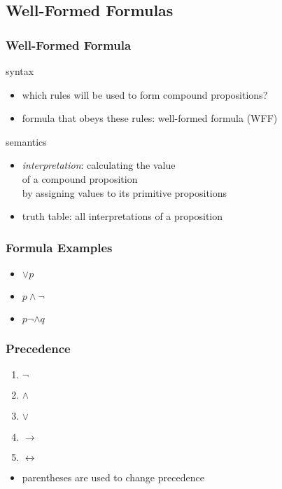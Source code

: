 \documentclass[dvipsnames]{beamer}
\begin{document}
\subsection{Well-Formed Formulas}

\begin{frame}
  \frametitle{Well-Formed Formula}

  \begin{block}{syntax}
    \begin{itemize}
      \item which rules will be used to form compound propositions?
      \item formula that obeys these rules: \alert{well-formed formula} (WFF)
    \end{itemize}
  \end{block}

  \pause
  \begin{block}{semantics}
    \begin{itemize}
      \item \emph{interpretation}: calculating the value\\
        of a compound proposition\\
        by assigning values to its primitive propositions
      \item truth table: all interpretations of a proposition
    \end{itemize}
  \end{block}
\end{frame}

\begin{frame}
  \frametitle{Formula Examples}

  \begin{example}
    \begin{itemize}
      \item $\vee p$
      \item $p \wedge \neg$
      \item $p \neg \wedge q$
    \end{itemize}
  \end{example}
\end{frame}

\begin{frame}
  \frametitle{Precedence}

  \begin{enumerate}
    \item $\neg$
    \item $\wedge$
    \item $\vee$
    \item $\rightarrow$
    \item $\leftrightarrow$
  \end{enumerate}

  \begin{itemize}
    \item parentheses are used to change precedence
  \end{itemize}
\end{frame}
\end{document}
